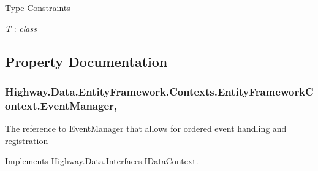 \begin{Desc}
\item[Type Constraints]\begin{description}
\item[{\em T} : {\em class}]\end{description}
\end{Desc}


\subsection{Property Documentation}
\hypertarget{class_highway_1_1_data_1_1_entity_framework_1_1_contexts_1_1_entity_framework_context_aefd1b923c2414387cddd0a579608039d}{
\subsubsection[{Event\-Manager}]{ Highway.\-Data.\-Entity\-Framework.\-Contexts.\-Entity\-Framework\-Context.\-Event\-Manager\hspace{0.3cm}{\ttfamily [get]}, {\ttfamily [set]}}}\label{class_highway_1_1_data_1_1_entity_framework_1_1_contexts_1_1_entity_framework_context_aefd1b923c2414387cddd0a579608039d}


The reference to Event\-Manager that allows for ordered event handling and registration 



Implements \hyperlink{interface_highway_1_1_data_1_1_interfaces_1_1_i_data_context_a66d20c659a7c50d08705534ad750e1f8}{Highway.\-Data.\-Interfaces.\-I\-Data\-Context}.



